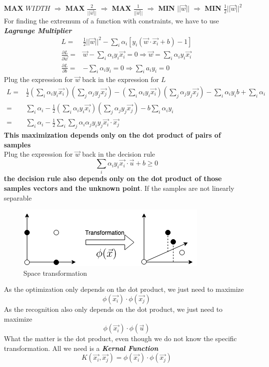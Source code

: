 \documentclass[12pt]{book}
\begin{document}
\indent \textbf{MAX} $WIDTH$ $\Longrightarrow$ \textbf{MAX} $\frac{2}{||\vec{w}||}$ $\Longrightarrow$ \textbf{MAX} $\frac{1}{||\vec{w}||}$ $\Longrightarrow$ \textbf{MIN} $||\vec{w}||$ $\Longrightarrow$ \textbf{MIN} $\frac{1}{2}||\vec{w}||^2  $\\
\indent For finding the extremum of a function with constraints, we have to use \textit{\textbf{Lagrange Multiplier}}
\begin{equation*}
\begin{aligned}
L = &\frac{1}{2}||\vec{w}||^2-\sum_i \alpha_i[y_i(\vec{w}\cdot \vec{x_i}+b)-1]\\
\frac{\partial L}{\partial \vec{w}} = &\vec{w}-\sum_i \alpha_i y_i\vec{x_i} = 0\Longrightarrow \boxed{\vec{w}=\sum_i \alpha_i y_i \vec{x_i}}\\
\frac{\partial L}{\partial b} = &-\sum_i\alpha_iy_i=0\Longrightarrow\boxed{\sum_ia_iy_i=0} 
\end{aligned}
\end{equation*}
\indent Plug the expression for $\vec{w}$ back in the expression for $L$
\begin{equation*}
\begin{aligned}
L = &\frac{1}{2}(\sum_i \alpha_iy_i\vec{x_i})(\sum_j \alpha_jy_j\vec{x_j})-(\sum_i \alpha_iy_i\vec{x_i})(\sum_j \alpha_jy_j\vec{x_j})-\sum_i \alpha_iy_ib+\sum_i \alpha_i\\
=&\sum_i \alpha_i-\frac{1}{2}(\sum_i \alpha_iy_i\vec{x_i})(\sum_j \alpha_jy_j\vec{x_j})-b\sum_i \alpha_iy_i\\
=&\sum_i \alpha_i-\frac{1}{2}\sum_i\sum_j\alpha_i\alpha_jy_iy_j\boxed{\vec{x_i}\cdot\vec{x_j}}
\end{aligned}
\end{equation*}
\indent \textbf{This maximization depends only on the dot product of pairs of samples}\\
\indent Plug the expression for $\vec{w}$ back in the decision rule\\
$$\sum_i\alpha_iy_i\vec{x_i}\cdot\vec{u}+b\geq 0$$
\indent \textbf{the decision rule also depends only on the dot product of those samples vectors and the unknown point}.
\newpage
\indent If the samples are not linearly separable
\begin{figure}[ht]
	\centering
	\includegraphics[scale=0.85]{Figure/Figure16_6.png}
	\caption{Space transformation}
\end{figure}
\newline
\indent As the optimization only depends on the dot product, we just need to maximize
$$\phi({\vec{x_i}})\cdot\phi({\vec{x_j}})$$
\indent As the recognition also only depends on the dot product, we just need to maximize
$$\phi({\vec{x_i}})\cdot\phi({\vec{u}})$$
\indent What the matter is the dot product, even though we do not know the specific transformation. All we need is a \textit{\textbf{Kernal Function}}
$$K(\vec{x_i},\vec{x_j})=\phi(\vec{x_i})\cdot \phi(\vec{x_j})$$
\end{document}
